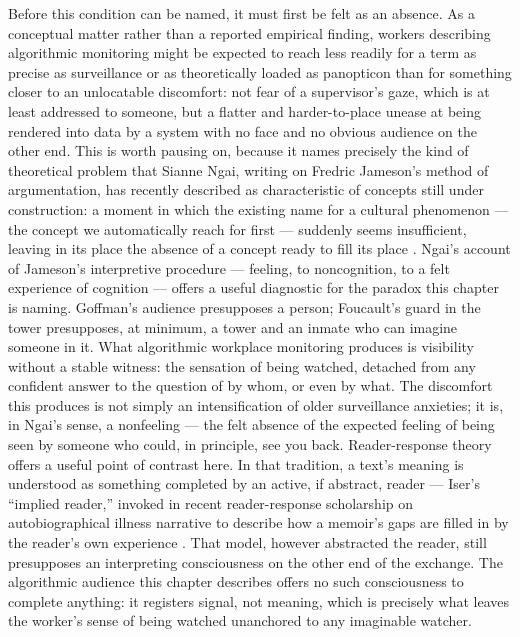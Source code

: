 \documentclass[10pt]{article}
\begin{document}
Before this condition can be named, it must first be felt as an absence. As a conceptual matter rather than a reported empirical finding, workers describing algorithmic monitoring might be expected to reach less readily for a term as precise as surveillance or as theoretically loaded as panopticon than for something closer to an unlocatable discomfort: not fear of a supervisor's gaze, which is at least addressed to someone, but a flatter and harder-to-place unease at being rendered into data by a system with no face and no obvious audience on the other end. This is worth pausing on, because it names precisely the kind of theoretical problem that Sianne Ngai, writing on Fredric Jameson's method of argumentation, has recently described as characteristic of concepts still under construction: a moment in which the existing name for a cultural phenomenon --- the concept we automatically reach for first --- suddenly seems insufficient, leaving in its place the absence of a concept ready to fill its place \cite{ngai}. Ngai's account of Jameson's interpretive procedure --- feeling, to noncognition, to a felt experience of cognition --- offers a useful diagnostic for the paradox this chapter is naming. Goffman's audience presupposes a person; Foucault's guard in the tower presupposes, at minimum, a tower and an inmate who can imagine someone in it. What algorithmic workplace monitoring produces is visibility without a stable witness: the sensation of being watched, detached from any confident answer to the question of by whom, or even by what. The discomfort this produces is not simply an intensification of older surveillance anxieties; it is, in Ngai's sense, a nonfeeling --- the felt absence of the expected feeling of being seen by someone who could, in principle, see you back. Reader-response theory offers a useful point of contrast here. In that tradition, a text's meaning is understood as something completed by an active, if abstract, reader --- Iser's ``implied reader,'' invoked in recent reader-response scholarship on autobiographical illness narrative to describe how a memoir's gaps are filled in by the reader's own experience \cite{vailankanni}. That model, however abstracted the reader, still presupposes an interpreting consciousness on the other end of the exchange. The algorithmic audience this chapter describes offers no such consciousness to complete anything: it registers signal, not meaning, which is precisely what leaves the worker's sense of being watched unanchored to any imaginable watcher.
\end{document}
